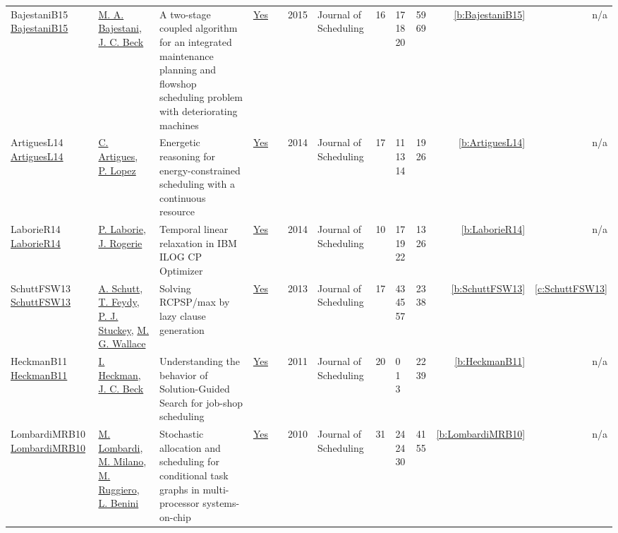 {\begin{longtable}{>{\raggedright\arraybackslash}p{3cm}>{\raggedright\arraybackslash}p{4.5cm}>{\raggedright\arraybackslash}p{6.0cm}rrrp{2.5cm}rp{1cm}p{1cm}rr}
BajestaniB15 \href{https://doi.org/10.1007/s10951-015-0416-2}{BajestaniB15} & \hyperref[auth:a817]{M. A. Bajestani}, \hyperref[auth:a89]{J. C. Beck} & A two-stage coupled algorithm for an integrated maintenance planning and flowshop scheduling problem with deteriorating machines & \href{../works/BajestaniB15.pdf}{Yes} & \cite{BajestaniB15} & 2015 & Journal of Scheduling & 16 & 17 18 20 & 59 69 & \ref{b:BajestaniB15} & n/a\\
ArtiguesL14 \href{http://dx.doi.org/10.1007/s10951-014-0404-y}{ArtiguesL14} & \hyperref[auth:a6]{C. Artigues}, \hyperref[auth:a3]{P. Lopez} & \cellcolor{green!10}Energetic reasoning for energy-constrained scheduling with a continuous resource & \href{../works/ArtiguesL14.pdf}{Yes} & \cite{ArtiguesL14} & 2014 & Journal of Scheduling & 17 & 11 13 14 & 19 26 & \ref{b:ArtiguesL14} & n/a\\
LaborieR14 \href{http://dx.doi.org/10.1007/s10951-014-0408-7}{LaborieR14} & \hyperref[auth:a118]{P. Laborie}, \hyperref[auth:a1070]{J. Rogerie} & Temporal linear relaxation in IBM ILOG CP Optimizer & \href{../works/LaborieR14.pdf}{Yes} & \cite{LaborieR14} & 2014 & Journal of Scheduling & 10 & 17 19 22 & 13 26 & \ref{b:LaborieR14} & n/a\\
SchuttFSW13 \href{https://doi.org/10.1007/s10951-012-0285-x}{SchuttFSW13} & \hyperref[auth:a124]{A. Schutt}, \hyperref[auth:a154]{T. Feydy}, \hyperref[auth:a125]{P. J. Stuckey}, \hyperref[auth:a117]{M. G. Wallace} & \cellcolor{green!10}Solving RCPSP/max by lazy clause generation & \href{../works/SchuttFSW13.pdf}{Yes} & \cite{SchuttFSW13} & 2013 & Journal of Scheduling & 17 & 43 45 57 & 23 38 & \ref{b:SchuttFSW13} & \ref{c:SchuttFSW13}\\
HeckmanB11 \href{https://doi.org/10.1007/s10951-009-0113-0}{HeckmanB11} & \hyperref[auth:a823]{I. Heckman}, \hyperref[auth:a89]{J. C. Beck} & Understanding the behavior of Solution-Guided Search for job-shop scheduling & \href{../works/HeckmanB11.pdf}{Yes} & \cite{HeckmanB11} & 2011 & Journal of Scheduling & 20 & 0 1 3 & 22 39 & \ref{b:HeckmanB11} & n/a\\
LombardiMRB10 \href{http://dx.doi.org/10.1007/s10951-010-0184-y}{LombardiMRB10} & \hyperref[auth:a142]{M. Lombardi}, \hyperref[auth:a143]{M. Milano}, \hyperref[auth:a718]{M. Ruggiero}, \hyperref[auth:a245]{L. Benini} & Stochastic allocation and scheduling for conditional task graphs in multi-processor systems-on-chip & \href{../works/LombardiMRB10.pdf}{Yes} & \cite{LombardiMRB10} & 2010 & Journal of Scheduling & 31 & 24 24 30 & 41 55 & \ref{b:LombardiMRB10} & n/a\\

\end{longtable}}
